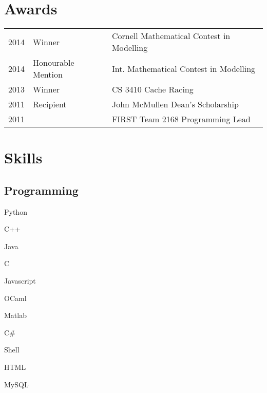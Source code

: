 \documentclass[]{deedy-resume-openfont}
\begin{document}
\begin{minipage}[t]{0.66\textwidth}
\section{Awards} 
\begin{tabular}{rll}
2014 & Winner & Cornell Mathematical Contest in Modelling\\
2014 & Honourable Mention & Int. Mathematical Contest in Modelling\\
2013 & Winner & CS 3410 Cache Racing\\
2011 & Recipient & John McMullen Dean's Scholarship\\
2011 & & FIRST Team 2168 Programming Lead
\end{tabular}
\sectionsep



\section{Skills}

\subsection{Programming}
\vspace{-\topsep}
\begin{minipage}[t]{0.32\textwidth}
\begin{tightemize}
\item Python
\item C++
\item Java
\end{tightemize}
\end{minipage}
\hfill
\begin{minipage}[t]{0.32\textwidth}
\begin{tightemize}
\item C
\item Javascript
\item OCaml
\item Matlab
\end{tightemize}
\end{minipage}
\hfill
\begin{minipage}[t]{0.32\textwidth}
\begin{tightemize}
\item C\#
\item Shell
\item HTML
\item MySQL
\end{tightemize}
\end{minipage}
\sectionsep


\end{minipage}
\end{document}
